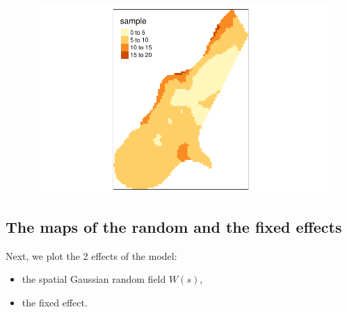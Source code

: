 \documentclass[
  a4paper,
]{article}
\begin{document}
\begin{figure}[H]

{\centering \includegraphics{pedometron_files/figure-pdf/unnamed-chunk-14-1.pdf}

}

\end{figure}

\hypertarget{the-maps-of-the-random-and-the-fixed-effects}{%
\subsection{The maps of the random and the fixed
effects}\label{the-maps-of-the-random-and-the-fixed-effects}}

Next, we plot the 2 effects of the model:

\begin{itemize}
\item
  the spatial Gaussian random field \(W(s)\),
\item
  the fixed effect.
\end{itemize}
\end{document}
